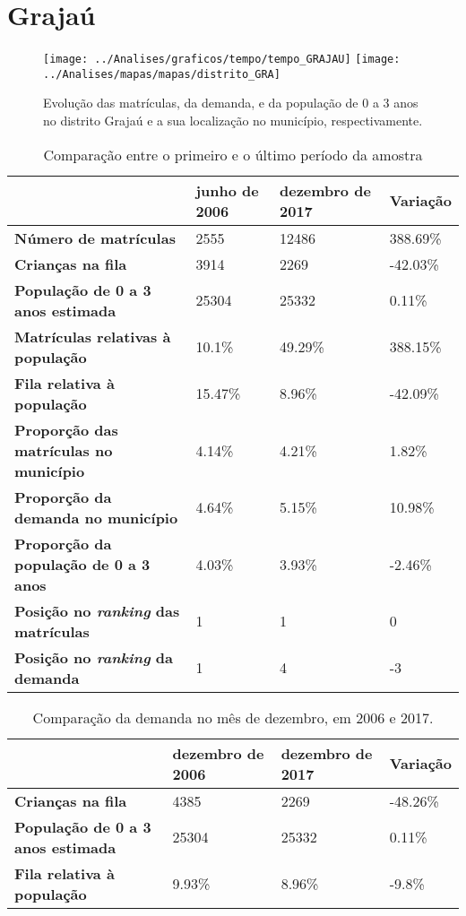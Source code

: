 \section{Grajaú}
\begin{figure}[H]
\centering
\texttt{[image: ../Analises/graficos/tempo/tempo\_GRAJAU]}
\texttt{[image: ../Analises/mapas/mapas/distrito\_GRA]}
\caption{Evolução das matrículas, da demanda, e da população de 0 a 3 anos no distrito Grajaú e a sua localização no município, respectivamente.}
\end{figure}
\begin{table}[H]
\begin{tabular}{l|l|l|l}
\textbf{}                                      & \textbf{junho de 2006}       & \textbf{dezembro de 2017}    & \textbf{Variação} \\ \hline
\textbf{Número de matrículas}                  & 2555 & 12486 & 388.69\% \\ \hline
\textbf{Crianças na fila}                      & 3914 & 2269 & -42.03\% \\ \hline
\textbf{População de 0 a 3 anos estimada}      & 25304 & 25332 & 0.11\% \\ \hline
\textbf{Matrículas relativas à população}      & 10.1\% & 49.29\% & 388.15\% \\ \hline
\textbf{Fila relativa à população}             & 15.47\% & 8.96\% & -42.09\% \\ \hline
\textbf{Proporção das matrículas no município} & 4.14\% & 4.21\% & 1.82\% \\ \hline
\textbf{Proporção da demanda no município}     & 4.64\% & 5.15\% & 10.98\% \\ \hline
\textbf{Proporção da população de 0 a 3 anos}  & 4.03\% & 3.93\% & -2.46\% \\ \hline
\textbf{Posição no \textit{ranking} das matrículas}     & 1 & 1 & 0 \\ \hline
\textbf{Posição no \textit{ranking} da demanda}         & 1 & 4 & -3 \\ 
\end{tabular}
\caption{Comparação entre o primeiro e o último período da amostra}
\end{table}
\begin{table}[H]
\begin{tabular}{l|l|l|l}
\textbf{}                                 & \textbf{dezembro de 2006} & \textbf{dezembro de 2017} & \textbf{Variação} \\ \hline
\textbf{Crianças na fila}                      & 4385 & 2269 & -48.26\% \\ \hline
\textbf{População de 0 a 3 anos estimada}      & 25304 & 25332 & 0.11\% \\ \hline
\textbf{Fila relativa à população}             & 9.93\% & 8.96\% & -9.8\% \\
\end{tabular}
\caption{Comparação da demanda no mês de dezembro, em 2006 e 2017.}
\end{table}
